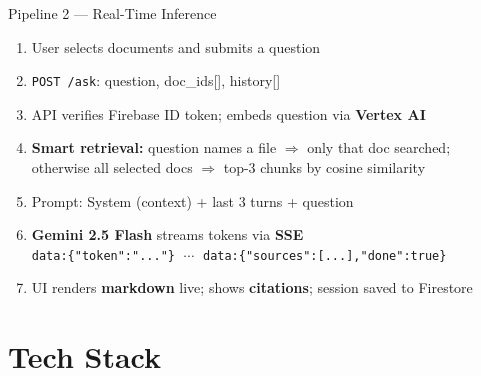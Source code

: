 \documentclass[aspectratio=169]{beamer}
\begin{document}
\begin{frame}[t,shrink=3]{Pipeline 2 — Real-Time Inference}
  \small
  \begin{enumerate}\setlength\itemsep{0.2em}
    \item[\textbf{1.}] User selects documents and submits a question
    \item[\textbf{2.}] \texttt{POST /ask}: question, doc\_ids[], history[]
    \item[\textbf{3.}] API verifies Firebase ID token; embeds question via \textbf{Vertex AI}
    \item[\textbf{4.}] \textbf{Smart retrieval:} question names a file
          $\Rightarrow$ only that doc searched;\\
          otherwise all selected docs $\Rightarrow$ top-3 chunks by cosine similarity
    \item[\textbf{5.}] Prompt: System (context) + last 3 turns + question
    \item[\textbf{6.}] \textbf{Gemini 2.5 Flash} streams tokens via \textbf{SSE}\\
          {\footnotesize\texttt{data:\{"token":"..."\}}
          $\;\cdots\;$
          \texttt{data:\{"sources":[...],"done":true\}}}
    \item[\textbf{7.}] UI renders \textbf{markdown} live; shows \textbf{citations};
          session saved to Firestore
  \end{enumerate}
\end{frame}

\section{Tech Stack}
\end{document}
